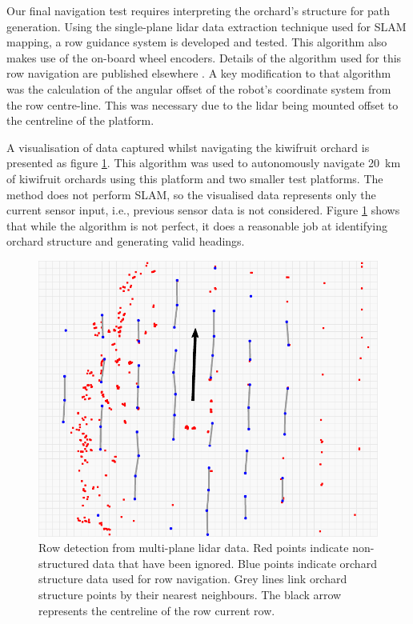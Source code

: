 \documentclass[preprint,authoryear,12pt]{elsarticle}
\begin{document}
        Our final navigation test requires interpreting the orchard's structure for path generation.
        Using the single-plane lidar data extraction technique used for SLAM mapping, a row guidance system is developed and tested.
        This algorithm also makes use of the on-board wheel encoders.
        Details of the algorithm used for this row navigation are published elsewhere \citep{Bell2016}.
        A key modification to that algorithm was the calculation of the angular offset of the robot's coordinate system from the row centre-line.
        This was necessary due to the lidar being mounted offset to the centreline of the platform.

        A visualisation of data captured whilst navigating the kiwifruit orchard is presented as figure \ref{fig:lastLidarFrame}.
        This algorithm was used to autonomously navigate \SI{20}{\kilo\meter} of kiwifruit orchards using this platform and two smaller test platforms.
        The method does not perform SLAM, so the visualised data represents only the current sensor input, i.e., previous sensor data is not considered.
        Figure \ref{fig:lastLidarFrame} shows that while the algorithm is not perfect, it does a reasonable job at identifying orchard structure and generating valid headings.

        \begin{figure}[htb]
            \centering
            \includegraphics[width=\linewidth]{imgs/row_following/row_following_narrow.pdf}
            \caption{
                Row detection from multi-plane lidar data.
                Red points indicate non-structured data that have been ignored.
                Blue points indicate orchard structure data used for row navigation.
                Grey lines link orchard structure points by their nearest neighbours.
                The black arrow represents the centreline of the row current row.
            }
            \label{fig:lastLidarFrame}
        \end{figure}
\end{document}
